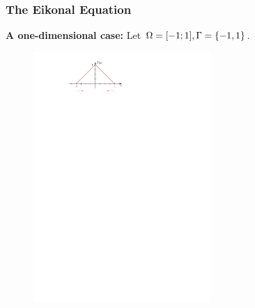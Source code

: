 \documentclass[aspectratio=169,handout]{beamer}
\begin{document}
\begin{frame}
	\frametitle{The Eikonal Equation}
	\textbf{A one-dimensional case:} Let $\Omega = [-1;1], \Gamma = \{-1,1\}$.
	\begin{figure}
		\includegraphics[width=0.6\textwidth]{./figs/1d-eikonal.pdf}
	\end{figure}
	
\end{frame}
\end{document}
